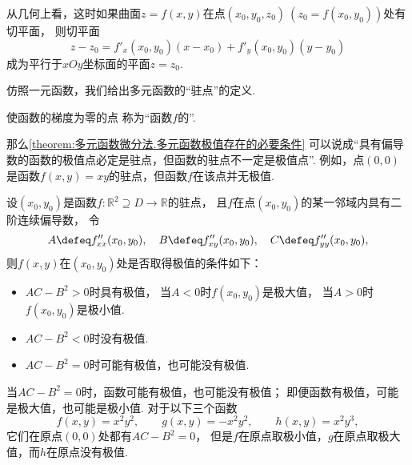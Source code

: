 从几何上看，这时如果曲面\(z=f(x,y)\)在点\((x_0,y_0,z_0)\ (z_0=f(x_0,y_0))\)处有切平面，
则切平面\begin{equation*}
	z-z_0=f'_x(x_0,y_0)(x-x_0)+f'_y(x_0,y_0)(y-y_0)
\end{equation*}成为平行于\(xOy\)坐标面的平面\(z=z_0\).

仿照一元函数，我们给出多元函数的“驻点”的定义.
\begin{definition}
使函数的梯度为零的点
称为“函数\(f\)的”.
\end{definition}
那么\cref{theorem:多元函数微分法.多元函数极值存在的必要条件}
可以说成“具有偏导数的函数的极值点必定是驻点，但函数的驻点不一定是极值点”.
例如，点\((0,0)\)是函数\(f(x,y) = xy\)的驻点，但函数\(f\)在该点并无极值.

\begin{theorem}[充分条件]\label{theorem:多元函数微分法.多元函数极值存在的充分条件}
设\((x_0,y_0)\)是函数\(f\colon \mathbb{R}^2 \supseteq D \to \mathbb{R}\)的驻点，
且\(f\)在点\((x_0,y_0)\)的某一邻域内具有二阶连续偏导数，
令\begin{equation*}
	A \defeq f''_{xx}(x_0,y_0),
	\quad
	B \defeq f''_{xy}(x_0,y_0),
	\quad
	C \defeq f''_{yy}(x_0,y_0),
\end{equation*}
则\(f(x,y)\)在\((x_0,y_0)\)处是否取得极值的条件如下：
\begin{itemize}
	\item \(AC-B^2>0\)时具有极值，
	当\(A<0\)时\(f(x_0,y_0)\)是极大值，
	当\(A>0\)时\(f(x_0,y_0)\)是极小值.
	\item \(AC-B^2<0\)时没有极值.
	\item \(AC-B^2=0\)时可能有极值，也可能没有极值.
\end{itemize}
\end{theorem}

\begin{example}
当\(AC-B^2=0\)时，函数可能有极值，也可能没有极值；
即便函数有极值，可能是极大值，也可能是极小值.
对于以下三个函数\begin{equation*}
	f(x,y) = x^2 y^2,
	\qquad
	g(x,y) = -x^2 y^2,
	\qquad
	h(x,y) = x^2 y^3,
\end{equation*}
它们在原点\((0,0)\)处都有\(AC-B^2=0\)，
但是\(f\)在原点取极小值，\(g\)在原点取极大值，而\(h\)在原点没有极值.
\end{example}

